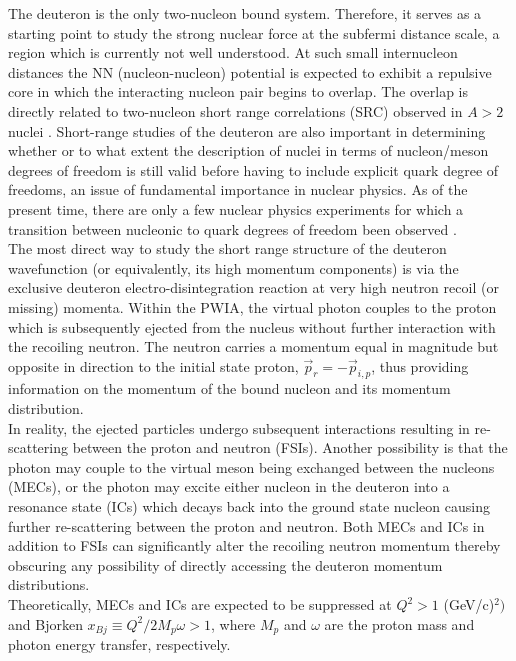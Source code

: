 The deuteron is the only two-nucleon bound system. Therefore, it serves as a starting point to study the strong nuclear force at the subfermi distance scale, a region which is currently
not well understood. At such small internucleon distances the NN (nucleon-nucleon) potential is expected to exhibit a repulsive core in which the interacting
nucleon pair begins to overlap. The overlap is directly related to two-nucleon short range correlations (SRC) observed in $A>2$ nuclei \cite{PhysRevC.68.014313,PhysRevLett.96.082501,PhysRevLett.99.072501,Fomin_2017}.
Short-range studies of the deuteron are also important in determining whether or to what extent the description of nuclei in terms of nucleon/meson degrees of freedom is still valid before
having to include explicit quark degree of freedoms, an issue of fundamental importance in nuclear physics\cite{pr01-020}. As of the present time, there are only a few nuclear physics experiments for
which a transition between nucleonic to quark degrees of freedom been observed \cite{PhysRevLett.81.4576,PhysRevLett.87.102302,PhysRevC.66.042201}.\\
\indent The most direct way to study the short range structure of the deuteron wavefunction (or equivalently, its high momentum components) is via the exclusive deuteron
electro-disintegration reaction at very high neutron recoil (or missing) momenta. Within the PWIA, the virtual photon couples to
the proton which is subsequently ejected from the nucleus without further interaction with the recoiling neutron. The neutron carries a momentum equal in magnitude but opposite in direction
to the initial state proton, $\vec{p}_{r} = -\vec{p}_{i,p}$, thus providing information on the momentum of the bound nucleon and its momentum distribution. \\
\indent In reality, the ejected particles undergo subsequent interactions resulting in re-scattering between the proton and neutron (FSIs). Another possibility is that the
photon may couple to the virtual meson being exchanged between the nucleons (MECs), or the photon may excite either nucleon in the deuteron into a resonance state (ICs) which
decays back into the ground state nucleon causing further re-scattering between the proton and neutron. Both MECs and ICs in addition to FSIs can significantly alter the recoiling neutron
momentum thereby obscuring any possibility of directly accessing the deuteron momentum distributions. \\
\indent Theoretically, MECs and ICs are expected to be suppressed at $Q^{2}>1$ (GeV/c)$^{2})$ and Bjorken $x_{Bj}\equiv Q^{2}/2M_{p}\omega>1$, where $M_{p}$ and $\omega$ are the proton mass and photon energy transfer, respectively.
